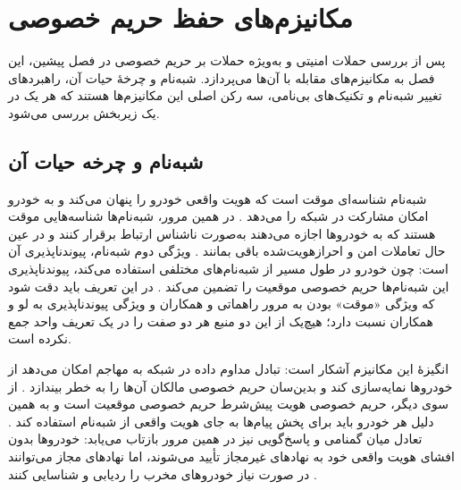 
\section{مکانیزم‌های حفظ حریم خصوصی}

پس از بررسی حملات امنیتی و به‌ویژه حملات بر حریم خصوصی در فصل پیشین، این فصل به مکانیزم‌های مقابله با آن‌ها می‌پردازد. شبه‌نام و چرخهٔ حیات آن، راهبردهای تغییر شبه‌نام و تکنیک‌های بی‌نامی، سه رکن اصلی این مکانیزم‌ها هستند که هر یک در یک زیربخش بررسی می‌شود.

\subsection{شبه‌نام و چرخه حیات آن}

شبه‌نام شناسه‌ای موقت است که هویت واقعی خودرو را پنهان می‌کند و به خودرو امکان مشارکت در شبکه را می‌دهد \cite{rahmawatiagustinaSystematicLiteratureReview2025}. در همین مرور، شبه‌نام‌ها شناسه‌هایی موقت هستند که به خودروها اجازه می‌دهند به‌صورت ناشناس ارتباط برقرار کنند و در عین حال تعاملات امن و احرازهویت‌شده باقی بمانند \cite{rahmawatiagustinaSystematicLiteratureReview2025}. ویژگی دوم شبه‌نام، پیوندناپذیری آن است: چون خودرو در طول مسیر از شبه‌نام‌های مختلفی استفاده می‌کند، پیوندناپذیری این شبه‌نام‌ها حریم خصوصی موقعیت را تضمین می‌کند \cite{luPseudonymChangingSocial2012}. در این تعریف باید دقت شود که ویژگی «موقت» بودن به مرور راهماتی و همکاران و ویژگی پیوندناپذیری به لو و همکاران نسبت دارد؛ هیچ‌یک از این دو منبع هر دو صفت را در یک تعریف واحد جمع نکرده است.

انگیزهٔ این مکانیزم آشکار است: تبادل مداوم داده در شبکه به مهاجم امکان می‌دهد از خودروها نمایه‌سازی کند و بدین‌سان حریم خصوصی مالکان آن‌ها را به خطر بیندازد \cite{rahmawatiagustinaSystematicLiteratureReview2025}. از سوی دیگر، حریم خصوصی هویت پیش‌شرط حریم خصوصی موقعیت است و به همین دلیل هر خودرو باید برای پخش پیام‌ها به جای هویت واقعی از شبه‌نام استفاده کند \cite{luPseudonymChangingSocial2012}. تعادل میان گمنامی و پاسخ‌گویی نیز در همین مرور بازتاب می‌یابد: خودروها بدون افشای هویت واقعی خود به نهادهای غیرمجاز تأیید می‌شوند، اما نهادهای مجاز می‌توانند در صورت نیاز خودروهای مخرب را ردیابی و شناسایی کنند \cite{rahmawatiagustinaSystematicLiteratureReview2025}.

